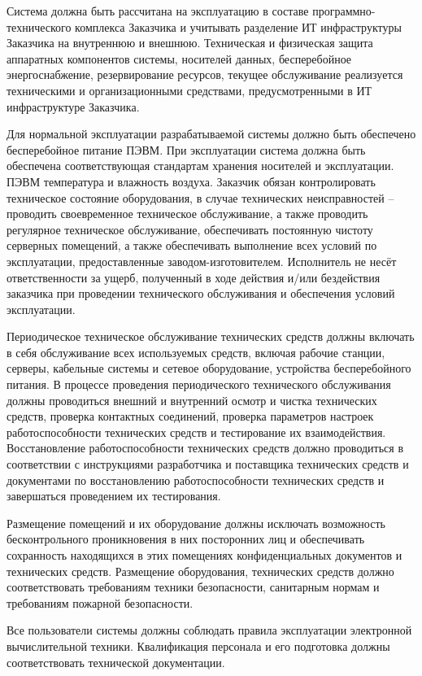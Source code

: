 Система должна быть рассчитана на эксплуатацию в составе программно-технического комплекса Заказчика и учитывать разделение ИТ инфраструктуры Заказчика на внутреннюю и внешнюю. Техническая и физическая защита аппаратных компонентов системы, носителей данных, бесперебойное энергоснабжение, резервирование ресурсов, текущее обслуживание реализуется техническими и организационными средствами, предусмотренными в ИТ инфраструктуре Заказчика. 

Для нормальной эксплуатации разрабатываемой системы должно быть обеспечено бесперебойное питание ПЭВМ. При эксплуатации система должна быть обеспечена соответствующая стандартам хранения носителей и эксплуатации. ПЭВМ температура и влажность воздуха. Заказчик обязан контролировать техническое состояние оборудования, в случае технических неисправностей – проводить своевременное техническое обслуживание, а также проводить регулярное техническое обслуживание, обеспечивать постоянную чистоту серверных помещений, а также обеспечивать выполнение всех условий по эксплуатации, предоставленные заводом-изготовителем. Исполнитель не несёт ответственности за ущерб, полученный в ходе действия и/или бездействия заказчика при проведении технического обслуживания и обеспечения условий эксплуатации. 

Периодическое техническое обслуживание технических средств должны включать в себя обслуживание всех используемых средств, включая рабочие станции, серверы, кабельные системы и сетевое оборудование, устройства бесперебойного питания. В процессе проведения периодического технического обслуживания должны проводиться внешний и внутренний осмотр и чистка технических средств, проверка контактных соединений, проверка параметров настроек работоспособности технических средств и тестирование их взаимодействия. Восстановление работоспособности технических средств должно проводиться в соответствии с инструкциями разработчика и поставщика технических средств и документами по восстановлению работоспособности технических средств и завершаться проведением их тестирования. 

Размещение помещений и их оборудование должны исключать возможность бесконтрольного проникновения в них посторонних лиц и обеспечивать сохранность находящихся в этих помещениях конфиденциальных документов и технических средств. Размещение оборудования, технических средств должно соответствовать требованиям техники безопасности, санитарным нормам и требованиям пожарной безопасности. 

Все пользователи системы должны соблюдать правила эксплуатации электронной вычислительной техники. Квалификация персонала и его подготовка должны соответствовать технической документации.

